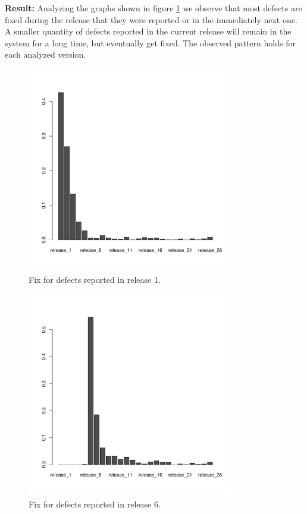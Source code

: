\vspace{1mm}
\noindent\textbf{Result:} Analyzing the graphs shown in figure \ref{fig:defect_release_1} we observe that most defects are fixed during the release that they were reported or in the immediately next one. A smaller quantity of defects reported in the current release will remain in the system for a long time, but eventually get fixed. The observed pattern holds for each analyzed version. 

\begin{figure}[thb!]
	\caption{Fix for defects reported in release 1.}
	\label{fig:defect_release_1}
	\includegraphics[width=90mm,scale=0.5]{figures/r1}
\end{figure}

\begin{figure}[thb!]
	\caption{Fix for defects reported in release 6.}
	\label{fig:defect_release_6}
	\includegraphics[width=90mm,scale=0.5]{figures/r6}
\end{figure}

